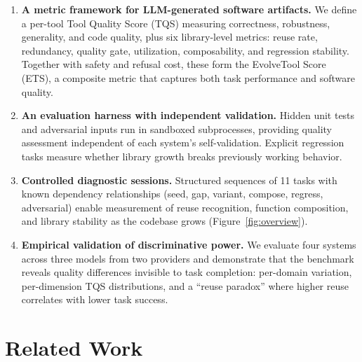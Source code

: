 \documentclass[sigconf,anonymous,review,natbib=false]{acmart}
\begin{document}
\begin{enumerate}
\item \textbf{A metric framework for LLM-generated software artifacts.} We define a per-tool Tool Quality Score (TQS) measuring correctness, robustness, generality, and code quality, plus six library-level metrics: reuse rate, redundancy, quality gate, utilization, composability, and regression stability. Together with safety and refusal cost, these form the EvolveTool Score (ETS), a composite metric that captures both task performance and software quality.

\item \textbf{An evaluation harness with independent validation.} Hidden unit tests and adversarial inputs run in sandboxed subprocesses, providing quality assessment independent of each system's self-validation. Explicit regression tasks measure whether library growth breaks previously working behavior.

\item \textbf{Controlled diagnostic sessions.} Structured sequences of 11 tasks with known dependency relationships (seed, gap, variant, compose, regress, adversarial) enable measurement of reuse recognition, function composition, and library stability as the codebase grows (Figure~\ref{fig:overview}).

\item \textbf{Empirical validation of discriminative power.} We evaluate four systems across three models from two providers and demonstrate that the benchmark reveals quality differences invisible to task completion: per-domain variation, per-dimension TQS distributions, and a ``reuse paradox'' where higher reuse correlates with lower task success.
\end{enumerate}

\section{Related Work}
\end{document}
